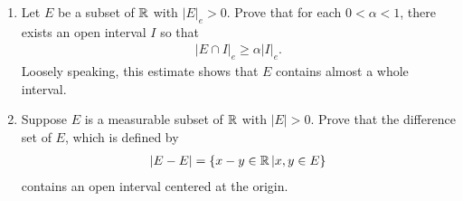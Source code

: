 \documentclass[UTF8,a4paper,10pt]{article}
\begin{document}
  \begin{Problem}[]{
    }
    \begin{enumerate}[label=(\alph*)]
      \item Let \(E\) be a subset of \(\operatorname{\mathbb{R}}\) with \(|E|_e > 0\). Prove that for each \(0 < \alpha < 1\), there
      exists an open interval \(I\) so that
      \begin{equation*}
        \begin{aligned}
          |E \cap I|_e \geq \alpha |I|_e.
        \end{aligned}
      \end{equation*}
      Loosely speaking, this estimate shows that \(E\) contains almost a whole interval.
      \item Suppose \(E\) is a measurable subset of \(\operatorname{\mathbb{R}}\) with \(|E| > 0\). Prove that the difference set of \(E\), which is defined by      
      \begin{equation*}
        \begin{aligned}
          |E - E| = \{x-y\in\operatorname{\mathbb{R}}|x,y\in E\}
        \end{aligned}
      \end{equation*}
      contains an open interval centered at the origin.
    \end{enumerate}

  \end{Problem}
\end{document}
